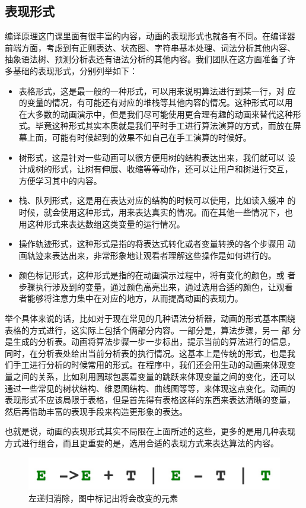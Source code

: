\subsection{表现形式}
编译原理这门课里面有很丰富的内容，动画的表现形式也就各有不同。在编译器
前端方面，考虑到有正则表达、状态图、字符串基本处理、词法分析其他内容、
抽象语法树、预测分析表还有语法分析的其他内容。我们团队在这方面准备了许
多基础的表现形式，分别列举如下：
\begin{itemize}
\item 表格形式，这是最一般的一种形式，可以用来说明算法进行到某一行，对
  应的变量的情况，有可能还有对应的堆栈等其他内容的情况。这种形式可以用
  在大多数的动画演示中，但是我们尽可能使用更合理有趣的动画来替代这种形
  式。毕竟这种形式其实本质就是我们平时手工进行算法演算的方式，而放在屏
  幕上面，可能有时候起到的效果不如自己在手工演算的时候好。
\item 树形式，这是针对一些动画可以很方便用树的结构表达出来，我们就可以
  设计成树的形式，让树有伸展、收缩等等动作，还可以让用户和树进行交互，
  方便学习其中的内容。
\item 栈、队列形式，这是用在表达对应的结构的时候可以使用，比如读入缓冲
  的时候，就会使用这种形式，用来表达真实的情况。而在其他一些情况下，也
  用这种形式来表达数组这类变量的运行情况。
\item 操作轨迹形式，这种形式是指的将表达式转化或者变量转换的各个步骤用
  动画轨迹来表达出来，非常形象地让观看者理解这些操作是如何进行的。
\item 颜色标记形式，这种形式是指的在动画演示过程中，将有变化的颜色，或
  者步骤执行涉及到的变量，通过颜色高亮出来，通过选用合适的颜色，让观看
  者能够将注意力集中在对应的地方，从而提高动画的表现力。
\end{itemize}

举个具体来说的话，比如对于现在常见的几种语法分析器，动画的形式基本围绕
表格的方式进行，这实际上包括个俩部分内容。一部分是，算法步骤，另一 部
分是生成的分析表。动画将算法步骤一步一步标出，提示当前的算法进行的信息，
同时，在分析表处给出当前分析表的执行情况。这基本上是传统的形式，也是我
们手工进行分析的时候常用的形式。在程序中，我们还会用生动的动画来体现变
量之间的关系，比如利用圆球包裹着变量的跳跃来体现变量之间的变化，还可以
通过一些常见的树状结构、维恩图结构、曲线图等等，来体现这点变化。动画的
表现形式不应该局限于表格，但是首先得有表格这样的东西来表达清晰的变量，
然后再借助丰富的表现手段来构造更形象的表达。

也就是说，动画的表现形式其实不局限在上面所述的这些，更多的是用几种表现
方式进行组合，而且更重要的是，选用合适的表现方式来表达算法的内容。
\begin{figure}[!htb]
\centering
\includegraphics[width=0.7\linewidth]{img/recursive.jpg}
\caption{左递归消除，图中标记出将会改变的元素}
\label{fig:recursive.jpg}
\end{figure}
